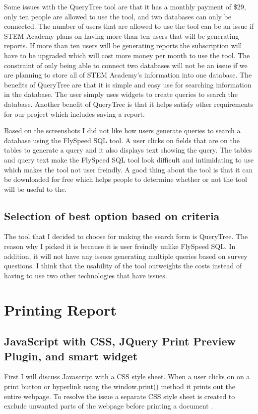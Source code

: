 \documentclass[12pt, draftclsnofoot, onecolumn]{IEEEtran}
\begin{document}
Some issues with the QueryTree tool are that it has a monthly payment of \$29, only ten people are allowed to use the tool, and two databases can only be connected. The number of users that are allowed to use the tool can be an issue if STEM Academy plans on having more than ten users that will be generating reports. If more than ten users will be generating reports the subscription will have to be upgraded which will cost more money per month to use the tool. The constraint of only being able to connect two databases will not be an issue if we are planning to store all of STEM Academy's information into one database. The benefits of QueryTree are that it is simple and easy use for searching information in the database. The user simply uses widgets to create queries to search the database. Another benefit of QueryTree is that it helps satisfy other requirements for our project which includes saving a report. 

Based on the screenshots I did not like how users generate queries to search a database using the FlySpeed SQL tool. A user clicks on fields that are on the tables to generate a query and it also displays text showing the query. The tables and query text make the FlySpeed SQL tool look difficult and intimidating to use which makes the tool not user freindly. A good thing about the tool is that it can be downloaded for free which helps people to determine whether or not the tool will be useful to the. 

\subsection{Selection of best option based on criteria} 
The tool that I decided to choose for making the search form is QueryTree. The reason why I picked it is because it is user freindly unlike FlySpeed SQL. In addition, it will not have any issues generating multiple queries based on survey questions. I think that the usability of the tool outweights the costs instead of having to use two other technologies that have issues. 




\section{Printing Report}

\subsection{JavaScript with CSS, JQuery Print Preview Plugin, and smart widget}
First I will discuss Javascript with a CSS style sheet. When a user clicks on on a print button or hyperlink using the window.print() method it prints out the entire webpage\cite{Javascript}. To resolve the issue a separate CSS style sheet is created to exclude unwanted parts of the webpage before printing a document \cite{Javascript}. 
\end{document}
